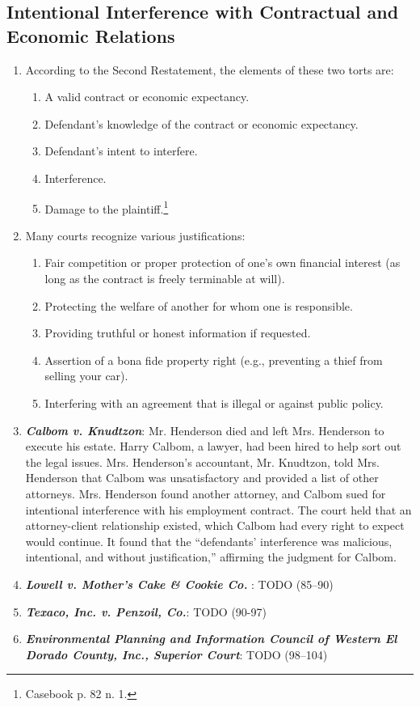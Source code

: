 \subsection{Intentional Interference with Contractual and Economic Relations}

\begin{enumerate}
    \item According to the Second Restatement, the elements of these two torts are:
    \begin{enumerate}
        \item A valid contract or economic expectancy.
        \item Defendant's knowledge of the contract or economic expectancy.
        \item Defendant's intent to interfere.
        \item Interference.
        \item Damage to the plaintiff.\footnote{Casebook p. 82 n. 1.}
    \end{enumerate}
    \item Many courts recognize various justifications:
    \begin{enumerate}
        \item Fair competition or proper protection of one's own financial interest (as long as the contract is freely terminable at will).
        \item Protecting the welfare of another for whom one is responsible.
        \item Providing truthful or honest information if requested.
        \item Assertion of a bona fide property right (e.g., preventing a thief from selling your car).
        \item Interfering with an agreement that is illegal or against public policy.
    \end{enumerate}
    \item \textbf{\emph{Calbom v. Knudtzon}}: Mr. Henderson died and left Mrs. Henderson to execute his estate. Harry Calbom, a lawyer, had been hired to help sort out the legal issues. Mrs. Henderson's accountant, Mr. Knudtzon, told Mrs. Henderson that Calbom was unsatisfactory and provided a list of other attorneys. Mrs. Henderson found another attorney, and Calbom sued for intentional interference with his employment contract. The court held that an attorney-client relationship existed, which Calbom had every right to expect would continue. It found that the ``defendants' interference was malicious, intentional, and without justification,'' affirming the judgment for Calbom.

    \item \textbf{\emph{Lowell v. Mother's Cake \& Cookie Co. }}: TODO (85--90)
    \item \textbf{\emph{Texaco, Inc. v. Penzoil, Co.}}: TODO (90-97)
    \item \textbf{\emph{Environmental Planning and Information Council of Western El Dorado County, Inc., Superior Court}}: TODO (98--104)
\end{enumerate}

